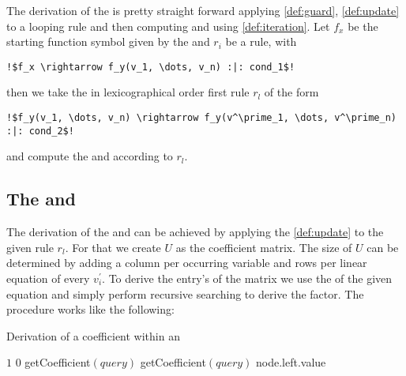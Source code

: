 The derivation of the \loopt is pretty straight forward applying \autoref{def:guard}, \autoref{def:update} to a looping rule and then computing \iterationmatrix and \iterationconstants using \autoref{def:iteration}. \newline
Let $f_x$ be the starting function symbol given by the \its and $r_i$ be a rule, with 
\begin{lstlisting}[escapechar=!]
	!$f_x \rightarrow f_y(v_1, \dots, v_n) :|: cond_1$!
\end{lstlisting} 
then we take the in lexicographical order first rule $r_l$ of the form 
\begin{lstlisting}[escapechar=!]
	!$f_y(v_1, \dots, v_n) \rightarrow f_y(v^\prime_1, \dots, v^\prime_n) :|: cond_2$!
\end{lstlisting}
and compute the \iterationmatrix and \iterationconstants according to $r_l$. 

\subsection{The \updatematrix and \updateconstants}
\label{sec:derivation-update}
The derivation of the \updatematrix and \updateconstants can be achieved by applying the \autoref{def:update} to the given rule $r_l$. For that we create $U$ as the coefficient matrix. The size of $U$ can be determined by adding a column per occurring variable and rows per linear equation of every $v^\prime_i$. To derive the entry's of the matrix we use the \rpntree of the given equation and simply perform recursive searching to derive the factor. 
The procedure works like the following:
\begin{algorithm}[H]
	\caption{Derivation of a coefficient within an \rpntree}
	\label{algo:coefficient}
	\begin{algorithmic}[1]
				\State \Return $1$
			 
				\State \Return $0$
			\EndIf
			\State
			 
					\State \Return getCoefficient$(query)$
				\Else
					\State \Return getCoefficient$(query)$
				\EndIf
			\EndIf
			 
					\State \Return node.left.value
				\EndIf				
			\EndIf
		\EndFunction
	\end{algorithmic}
\end{algorithm}

